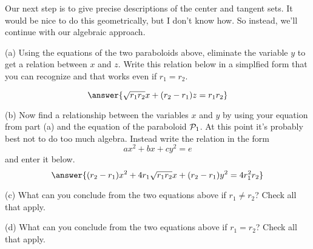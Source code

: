 \documentclass{ximera}
\begin{document}
\begin{question} \label{Q5r43rd:Spheres}

Our next step is to give precise descriptions of the center and tangent sets. It would be nice to do this geometrically, but I don't know how. So instead, we'll continue with our algebraic approach.

(a) Using the equations of the two paraboloids above, eliminate the variable $y$ to get a relation between $x$ and $z$. Write this relation below in a simplfied form that you can recognize and that works even if $r_1 = r_2$.

\[
    \answer{\sqrt{r_1 r_2}x + (r_2 - r_1) z = r_1 r_2}
\]

(b) Now find a relationship between the variables $x$ and $y$ by using your equation from part (a) and the equation of the paraboloid ${\cal P}_1$. At this point it's probably best not to do too much algebra. Instead write the relation in the form 
\[
   ax^2 + bx + cy^2 = e 
\]
and enter it below.
\[
    \answer{(r_2 - r_1)x^2 + 4 r_1\sqrt{r_1r_2}x + (r_2-r_1)y^2 =  4r_1^2 r_2}
\]

(c) What can you conclude from the two equations above if $r_1\neq r_2$? Check all that apply.
 \begin{selectAll}  
  \end{selectAll}  

(d) What can you conclude from the two equations above if $r_1= r_2$? Check all that apply.
 \begin{selectAll}  
  \end{selectAll}



 
\begin{onlineOnly}
    \begin{center}
\end{center}
\end{onlineOnly}


\end{question}
\end{document}
